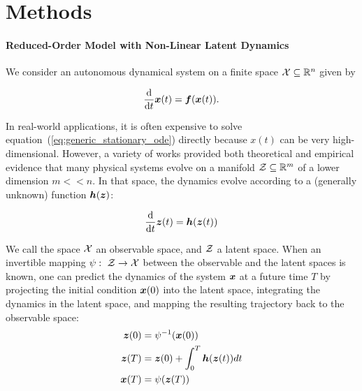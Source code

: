 
\section{Methods}
\label{sec:method}
\paragraph{Reduced-Order Model with Non-Linear Latent Dynamics}
We consider an autonomous dynamical system on a finite space $\operatorname{\mathcal{X}} \subseteq \mathbb{R}^n$ given by

\begin{equation}
    \label{eq:generic_stationary_ode}
        \frac{\mathrm{d}}{\mathrm{d}t}\boldsymbol{x}(t) = \boldsymbol{f}(\boldsymbol{x}(t)).
\end{equation}

In real-world applications, it is often expensive to solve equation~(\ref{eq:generic_stationary_ode}) directly because $x(t)$ can be very high-dimensional. However, a variety of works provided both theoretical \cite{holmes2012turbulence} and empirical \cite{noack2011reduced,chen2021discovering} evidence that many physical systems evolve on a manifold $\operatorname{\mathcal{Z}} \subseteq \mathbb{R}^m$ of a lower dimension $m << n$. In that space, the dynamics evolve according to a (generally unknown) function  $\boldsymbol{h}(\boldsymbol{z})$:

\begin{equation}
    \label{eq:latent_stationary_ode}
        \frac{\mathrm{d}}{\mathrm{d}t}\boldsymbol{z}(t) = \boldsymbol{h}(\boldsymbol{z}(t))
\end{equation}

We call the space $\operatorname{\mathcal{X}}$ an observable space, and $\operatorname{\mathcal{Z}}$ a latent space. When an invertible mapping $\psi:\ \operatorname{\mathcal{Z}} \to \operatorname{\mathcal{X}}$ between the observable and the latent spaces is known, one can predict the dynamics of the system $\boldsymbol{x}$ at a future time $T$ by projecting the initial condition $\boldsymbol{x}(0)$ into the latent space, integrating the dynamics in the latent space, and mapping the resulting trajectory back to the observable space:
\begin{equation}
\label{eq:integration_in_latent_space}
\begin{split}
    \boldsymbol{z}(0) & = \psi^{-1}(\boldsymbol{x}(0)) \\
    \boldsymbol{z}(T) & = \boldsymbol{z}(0) + \int_{0}^T\boldsymbol{h}(\boldsymbol{z}(t))dt \\
    \boldsymbol{x}(T) & = \psi(\boldsymbol{z}(T))
\end{split}
\end{equation}

